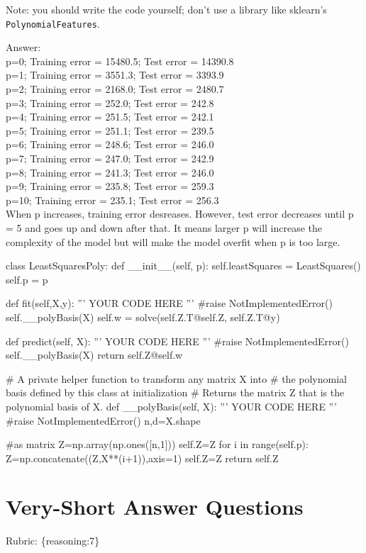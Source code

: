 \documentclass{article}
\def\rubric#1{\gre{Rubric: \{#1\}}}{}
\def\ans#1{\par\gre{Answer: #1}}
\def\gre#1{{\color{gre}#1}}
\begin{document}
Note: you should write the code yourself; don't use a library like sklearn's \texttt{PolynomialFeatures}.
\ans{\\
p=0;
Training error = 15480.5;
Test error     = 14390.8\\
p=1;
Training error = 3551.3;
Test error     = 3393.9\\
p=2;
Training error = 2168.0;
Test error     = 2480.7\\
p=3;
Training error = 252.0;
Test error     = 242.8\\
p=4;
Training error = 251.5;
Test error     = 242.1\\
p=5;
Training error = 251.1;
Test error     = 239.5\\
p=6;
Training error = 248.6;
Test error     = 246.0\\
p=7;
Training error = 247.0;
Test error     = 242.9\\
p=8;
Training error = 241.3;
Test error     = 246.0\\
p=9;
Training error = 235.8;
Test error     = 259.3\\
p=10;
Training error = 235.1;
Test error     = 256.3\\
When p increases, training error desreases. However, test error decreases until p = 5 and goes up and down after that. It means larger p will increase the complexity of the model but will make the model overfit when p is too large.}
\begin{python}
	class LeastSquaresPoly:
	def __init__(self, p):
	self.leastSquares = LeastSquares()
	self.p = p
	
	def fit(self,X,y):
	''' YOUR CODE HERE '''
	#raise NotImplementedError()
	self.__polyBasis(X)
	self.w = solve(self.Z.T@self.Z, self.Z.T@y)
	
	def predict(self, X):
	''' YOUR CODE HERE '''
	#raise NotImplementedError()
	self.__polyBasis(X)
	return self.Z@self.w
	
	# A private helper function to transform any matrix X into
	# the polynomial basis defined by this class at initialization
	# Returns the matrix Z that is the polynomial basis of X.
	def __polyBasis(self, X):
	''' YOUR CODE HERE '''
	#raise NotImplementedError()
	n,d=X.shape
	
	#as matrix
	Z=np.array(np.ones([n,1]))
	self.Z=Z
	for i in range(self.p):
	Z=np.concatenate((Z,X**(i+1)),axis=1)
	self.Z=Z
	return self.Z
\end{python}


\section{Very-Short Answer Questions}
\rubric{reasoning:7}
\end{document}
